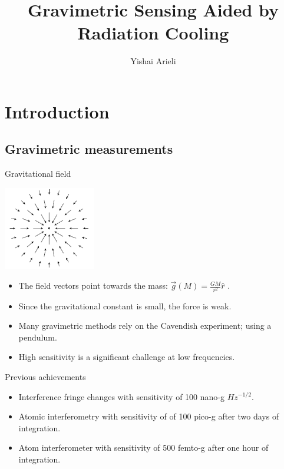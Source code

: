 \documentclass{beamer}
\title[Gravimetric Sensing Aided by Radiation Cooling]{Gravimetric Sensing Aided by Radiation Cooling}
\author[Yishai Arieli]{Yishai Arieli}
\begin{document}
	\typesetFrontSlides

\section{Introduction}



\subsection{Gravimetric measurements}
\begin{frame}{\hypertarget{frame:Gravitational field}{Gravitational field}}
	\begin{center}		
		\includegraphics[width=0.3\textwidth,keepaspectratio]{gravity.png}
    \end{center}
	\begin{itemize}
		\item The field vectors point towards the mass: $\overrightarrow{g}(M) = \frac{GM}{r^2}\hat{r}$ .
		\item Since the gravitational constant is small, the force is weak.
		\item Many gravimetric methods rely on the Cavendish experiment; using a pendulum.
		\item High sensitivity is a significant challenge at low frequencies.
		\end{itemize}
\end{frame}

\begin{frame}{Previous achievements}
	
	\begin{itemize}

		\item Interference fringe changes with sensitivity of 100 nano-g $Hz^{-1/2}$.
		\item Atomic interferometry with sensitivity of of 100 pico-g after two days of integration.
		\item Atom interferometer with sensitivity of 500 femto-g after one hour of integration.
		
	\end{itemize}
\end{frame}
\end{document}
